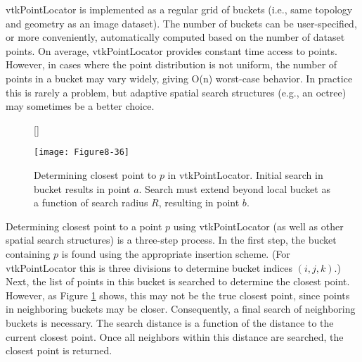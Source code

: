 vtkPointLocator is implemented as a regular grid of buckets (i.e., same topology and geometry as an image dataset). The number of buckets can be user-specified, or more conveniently, automatically computed based on the number of dataset points. On average, vtkPointLocator provides constant time access to points. However, in cases where the point distribution is not uniform, the number of points in a bucket may vary widely, giving O(n) worst-case behavior. In practice this is rarely a problem, but adaptive spatial search structures (e.g., an octree) may sometimes be a better choice.


\begin{figure}[!htb]
	[\FBwidth]
	{\caption{Determining closest point to $p$ in vtkPointLocator. Initial search in bucket results in point $a$. Search must extend beyond local bucket as a function of search radius $R$, resulting in point $b$.}\label{fig:Figure8-36}}
	{\texttt{[image: Figure8-36]}}
\end{figure}

Determining closest point to a point $p$ using vtkPointLocator (as well as other spatial search structures) is a three-step process. In the first step, the bucket containing $p$ is found using the appropriate insertion scheme. (For vtkPointLocator this is three divisions to determine bucket indices $(i, j, k)$.) Next, the list of points in this bucket is searched to determine the closest point. However, as Figure \ref{fig:Figure8-36} shows, this may not be the true closest point, since points in neighboring buckets may be closer. Consequently, a final search of neighboring buckets is necessary. The search distance is a function of the distance to the current closest point. Once all neighbors within this distance are searched, the closest point is returned.

